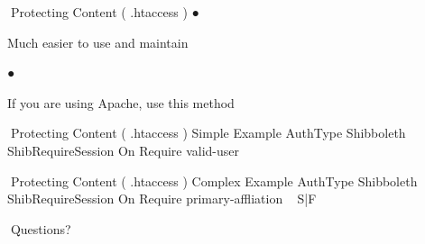 Protecting Content ( .htaccess )
●

Much easier to use and maintain

●

If you are using Apache, use this method

Protecting Content ( .htaccess )
Simple Example
AuthType Shibboleth
ShibRequireSession On
Require valid-user

Protecting Content ( .htaccess )
Complex Example
AuthType Shibboleth
ShibRequireSession On
Require primary-affliation ~ S|F

Questions?

